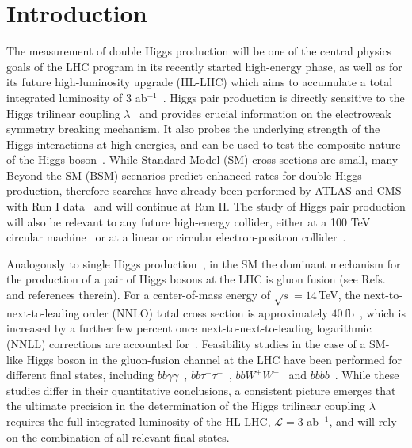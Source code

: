 \section{Introduction}

The measurement of double Higgs production will be one of the central
physics goals of the LHC program in its recently started high-energy
phase, as well as for its future high-luminosity upgrade (HL-LHC)
which aims to accumulate a total integrated
luminosity of 3 ab$^{-1}$~\cite{ATLAS:2013hta,CMS:2013xfa}.
%
Higgs pair production is directly sensitive to the
Higgs trilinear coupling $\lambda$~\cite{baglio} and 
provides crucial
information on the electroweak symmetry breaking mechanism.
%
It also probes the underlying strength of the Higgs interactions
at high energies, and can be used to test the composite nature of the 
Higgs boson~\cite{Giudice:2007fh,Contino:2010mh}.
%
While Standard Model (SM) cross-sections are small,
many Beyond the SM (BSM)
scenarios predict enhanced rates for double Higgs production, therefore searches have already been performed by ATLAS and CMS with Run I data~\cite{Aad:2015xja,Aad:2015uka,Aad:2014yja,Khachatryan:2015yea,Chatrchyan:2011wt}
and will continue at Run II.
%
The study of Higgs pair production will also be relevant to
any future high-energy 
collider, either at a 100 TeV circular machine~\cite{Arkani-Hamed:2015vfh,Barr:2014sga,Papaefstathiou:2015iba,Azatov:2015oxa} or at
a linear or circular electron-positron collider~\cite{Contino:2013gna}.

Analogously to single Higgs production~\cite{Dittmaier:2012vm}, 
in the SM the dominant mechanism for the production of a pair of
Higgs bosons at the LHC is 
gluon fusion (see Refs.~\cite{baglio,Frederix:2014hta} and
references therein).
%
For a center-of-mass energy of $\sqrt{s} = 14\,$TeV, the
next-to-next-to-leading order (NNLO)
total cross section is approximately $40\,$fb~\cite{deFlorian:2013jea},
which is increased by a further few percent once
next-to-next-to-leading logarithmic
(NNLL) corrections
are accounted for~\cite{deFlorian:2015moa}.
%
Feasibility studies in the case of a SM-like Higgs boson
in the gluon-fusion channel
at the LHC have been performed for different final states, including
$b\bar b\gamma\gamma$~\cite{Baur:2003gp,Barger:2013jfa},
$b\bar{b}\tau^+\tau^-$~\cite{Baur:2003gpa,Barr:2013tda,Dolan:2012rv,Dolan:2013rja},
$b\bar{b}W^+W^-$~\cite{Dolan:2012rv,Papaefstathiou:2012qe} and
$b\bar{b}b\bar{b}$~\cite{Baur:2003gpa,Dolan:2012rv,Wardrope:2014kya,deLima:2014dta,Barger:2013jfa}.
%
While these studies differ in their quantitative conclusions,
a consistent picture emerges 
that the ultimate precision in the determination of the Higgs trilinear
coupling $\lambda$ requires the full integrated luminosity
of the HL-LHC, $\mathcal{L}=3$ ab$^{-1}$,
and will rely on the combination of all relevant final states.


